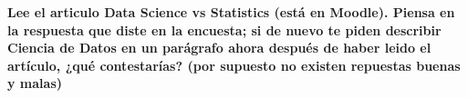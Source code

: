 \item \textbf{Lee el articulo Data Science vs Statistics (está en Moodle). Piensa en la respuesta que diste en la encuesta; si de nuevo te piden describir Ciencia de Datos en un parágrafo ahora después de haber leido el artículo, ¿qué contestarías? (por supuesto no existen repuestas buenas y malas)}